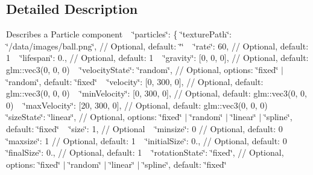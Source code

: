 \subsection{Detailed Description}
Describes a Particle component ~\newline
 \char`\"{}particles\char`\"{}\+: \{ \char`\"{}texture\+Path\char`\"{}\+: \char`\"{}/data/images/ball.\+png\char`\"{}, // Optional, default\+: \char`\"{}\char`\"{} ~\newline
 \char`\"{}rate\char`\"{}\+: 60, // Optional, default\+: 1 ~\newline
 \char`\"{}lifespan\char`\"{}\+: 0., // Optional, default\+: 1 ~\newline
 \char`\"{}gravity\char`\"{}\+: \mbox{[}0, 0, 0\mbox{]}, // Optional, default\+: glm\+::vec3(0, 0, 0) ~\newline
 \char`\"{}velocity\+State\char`\"{}\+: \char`\"{}random\char`\"{}, // Optional, options\+: \char`\"{}fixed\char`\"{} $\vert$ \char`\"{}random\char`\"{}, default\+: \char`\"{}fixed\char`\"{} ~\newline
 \char`\"{}velocity\char`\"{}\+: \mbox{[}0, 300, 0\mbox{]}, // Optional, default\+: glm\+::vec3(0, 0, 0) ~\newline
 \char`\"{}min\+Velocity\char`\"{}\+: \mbox{[}0, 300, 0\mbox{]}, // Optional, default\+: glm\+::vec3(0, 0, 0) ~\newline
 \char`\"{}max\+Velocity\char`\"{}\+: \mbox{[}20, 300, 0\mbox{]}, // Optional, default\+: glm\+::vec3(0, 0, 0) ~\newline
 \char`\"{}size\+State\char`\"{}\+: \char`\"{}linear\char`\"{}, // Optional, options\+: \char`\"{}fixed\char`\"{} $\vert$ \char`\"{}random\char`\"{} $\vert$ \char`\"{}linear\char`\"{} $\vert$ \char`\"{}spline\char`\"{}, default\+: \char`\"{}fixed\char`\"{} ~\newline
 \char`\"{}size\char`\"{}\+: 1, // Optional ~\newline
 \char`\"{}minsize\char`\"{}\+: 0 // Optional, default\+: 0 ~\newline
 \char`\"{}maxsize\char`\"{}\+: 1 // Optional, default\+: 1 ~\newline
 \char`\"{}initial\+Size\char`\"{}\+: 0., // Optional, default\+: 0 ~\newline
 \char`\"{}final\+Size\char`\"{}\+: 0., // Optional, default\+: 1 ~\newline
 \char`\"{}rotation\+State\char`\"{}\+: \char`\"{}fixed\char`\"{}, // Optional, options\+: \char`\"{}fixed\char`\"{} $\vert$ \char`\"{}random\char`\"{} $\vert$ \char`\"{}linear\char`\"{} $\vert$ \char`\"{}spline\char`\"{}, default\+: \char`\"{}fixed\char`\"{} ~\newline
